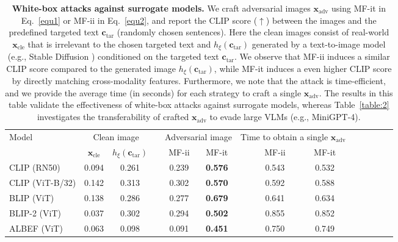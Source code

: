\setlength{\tabcolsep}{1.5 mm}
\renewcommand{\arraystretch}{1.25}
\begin{table}[t]
\vspace{-0.cm}
    \centering
    \caption{
    \textbf{White-box attacks against surrogate models.}
    We craft adversarial images $\boldsymbol{x}_{\text{adv}}$ using MF-it in Eq.~\eqref{equ1} or MF-ii in Eq.~\eqref{equ2}, and report the CLIP score ($\uparrow$) between the images and the predefined targeted text $\boldsymbol{c}_{\text{tar}}$ (randomly chosen sentences). Here the clean images consist of real-world $\boldsymbol{x}_{\text{cle}}$ that is irrelevant to the chosen targeted text and $h_{\xi}(\boldsymbol{c}_{\text{tar}})$ generated by a text-to-image model (e.g., Stable Diffusion \cite{rombach2022high}) conditioned on the targeted text $\boldsymbol{c}_\text{tar}$.
    We observe that MF-ii induces a similar CLIP score compared to the generated image $h_{\xi}(\boldsymbol{c}_{\text{tar}})$, while MF-it induces a even higher CLIP score by directly matching cross-modality features.
    Furthermore, we note that the attack is time-efficient, and we provide the average time (in seconds) for each strategy to craft a single $\boldsymbol{x}_{\text{adv}}$. The results in this table validate the effectiveness of white-box attacks against surrogate models, whereas Table~\ref{table:2} investigates the transferability of crafted $\boldsymbol{x}_{\text{adv}}$ to evade large VLMs (e.g., MiniGPT-4).
    }
    \vspace{0.1cm}
    \centering
    \small 
    \begin{tabular}{ l | cc ccc | ccc ccccc }
    \toprule[1.5pt]
         \multirow{2}{*}{Model} & \multicolumn{2}{c}{{Clean image}} & &  \multicolumn{2}{c|}{{Adversarial image}} & \multicolumn{3}{c}{{Time to obtain a single $\boldsymbol{x}_{\text{adv}}$}}
         \\ 
         & {$\boldsymbol{x}_{\text{cle}}$} & {$h_{\xi}(\boldsymbol{c}_{\text{tar}})$} & & {MF-ii} & {MF-it} && {MF-ii} & {MF-it} \\
         \midrule[0.8pt]
         CLIP (RN50) \cite{radford2021learning} & 0.094 & 0.261 & & 0.239 & \textbf{0.576} && {0.543} & {0.532}
         \\
         CLIP (ViT-B/32) \cite{radford2021learning} & 0.142 & 0.313 & & 0.302 & \textbf{0.570} && {0.592} & {0.588}
         \\
         BLIP (ViT) \cite{li2022blip} & 0.138 & 0.286 & & 0.277 & \textbf{0.679} && {0.641} & {0.634}
         \\
         BLIP-2 (ViT) \cite{li2023blip} & 0.037 & 0.302 & & 0.294 & \textbf{0.502} && {0.855} & {0.852}
         \\
         ALBEF (ViT) \cite{ALBEF} & 0.063 & 0.098 & & 0.091 & \textbf{0.451} && {0.750} & {0.749}
         \\
    \bottomrule[1.5pt]
    \end{tabular}
    \label{table:1}
\end{table}%

